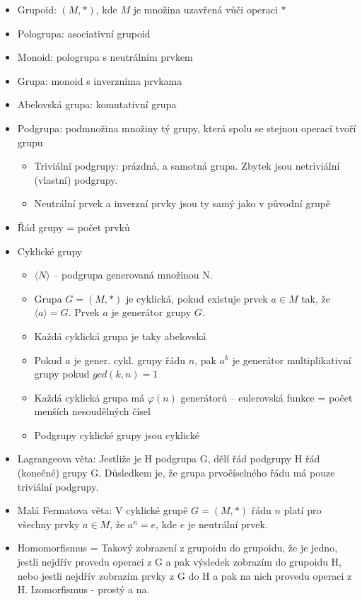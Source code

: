 \documentclass[a4paper,hidelinks]{article}
\begin{document}
\begin{itemize}
    \item Grupoid: $(M, *)$, kde $M$ je množina uzavřená vůči operaci $*$
    \item Pologrupa: asociativní grupoid
    \item Monoid: pologrupa s neutrálním prvkem
    \item Grupa: monoid s inverzníma prvkama
    \item Abelovská grupa: komutativní grupa
    \item Podgrupa: podmnožina množiny tý grupy, která spolu se stejnou operací tvoří grupu
    \begin{itemize}
        \item Triviální podgrupy: prázdná, a samotná grupa. Zbytek jsou netriviální (vlastní) podgrupy.
        \item Neutrální prvek a inverzní prvky jsou ty samý jako v původní grupě
    \end{itemize}
    \item Řád grupy = počet prvků
    \item Cyklické grupy
    \begin{itemize}      
        \item $\langle N \rangle$ -- podgrupa generovaná množinou N.
        \item Grupa $G = (M,*)$ je cyklická, pokud existuje prvek $a \in M$ tak, že $\langle a \rangle  = G$. Prvek $a$ je generátor grupy $G$. 
        \item Každá cyklická grupa je taky abelovská
        \item Pokud $a$ je gener. cykl. grupy řádu $n$, pak $a^k$ je generátor multiplikativní grupy pokud $gcd(k, n) = 1$
        \item Každá cyklická grupa má $\varphi(n)$ generátorů -- eulerovská funkce = počet menších nesoudělných čísel
        \item Podgrupy cyklické grupy jsou cyklické
    \end{itemize}
    \item Lagrangeova věta: Jestliže je H podgrupa G, dělí řád podgrupy H řád (konečné) grupy G. Důsledkem je, že grupa prvočíselného řádu má pouze triviální podgrupy.
    \item Malá Fermatova věta: V cyklické grupě $G = (M,*)$ řádu $n$ platí pro všechny prvky $a \in M$, že $a^n = e$, kde $e$ je neutrální prvek.
    \item Homomorfismus = Takový zobrazení z grupoidu do grupoidu, že je jedno, jestli nejdřív provedu operaci z G a pak výsledek zobrazím do grupoidu H, nebo jestli nejdřív zobrazím prvky z G do H a pak na nich provedu operaci z H. Izomorfismus - prostý a na.
\end{itemize}
\end{document}
